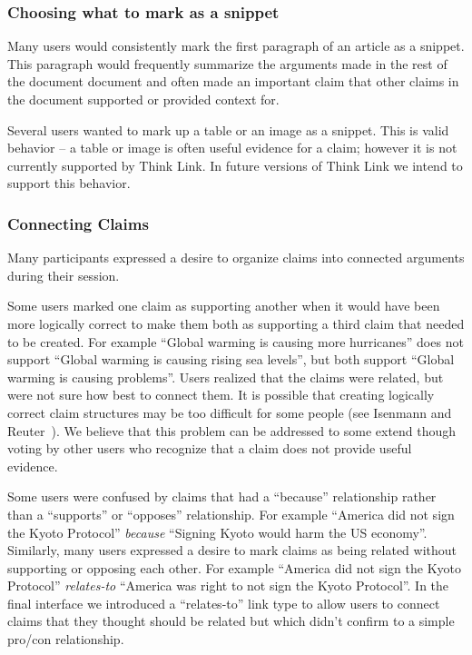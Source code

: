 \documentclass{chi2009}
\newcommand{\todo}[1]{}
\begin{document}
\todo{Need to do some kind of evaluation to show that the new interface solves these problems}


\subsubsection{Choosing what to mark as a snippet}

Many users would consistently mark the first paragraph of an article as a snippet. This paragraph would frequently summarize the arguments made in the rest of the document document and often made an important claim that other claims in the document supported or provided context for. 

Several users wanted to mark up a table or an image as a snippet. This is valid behavior -- a table or image is often useful evidence for a claim; however it is not currently supported by Think Link. In future versions of Think Link we intend to support this behavior.


\subsubsection{Connecting Claims}

Many participants expressed a desire to organize claims into connected arguments during their session. 

Some users marked one claim as supporting another when it would have been more logically correct to make them both as supporting a third claim that needed to be created. For example ``Global warming is causing more hurricanes'' does not support ``Global warming is causing rising sea levels'', but both support ``Global warming is causing problems''. Users realized that the claims were related, but were not sure how best to connect them. It is possible that creating logically correct claim structures may be too difficult for some people (see Isenmann and Reuter~\cite{Isenmann1997}). We believe that this problem can be addressed to some extend though voting by other users who recognize that a claim does not provide useful evidence.

Some users were confused by claims that had a ``because'' relationship rather than a ``supports'' or ``opposes'' relationship. For example ``America did not sign the Kyoto Protocol'' {\it because} ``Signing Kyoto would harm the US economy''. Similarly, many users expressed a desire to mark claims as being related without supporting or opposing each other. For example ``America did not sign the Kyoto Protocol'' {\it  relates-to} ``America was right to not sign the Kyoto Protocol''. In the final interface we introduced a ``relates-to'' link type to allow users to connect claims that they thought should be related but which didn't confirm to a simple pro/con relationship. 
\end{document}
